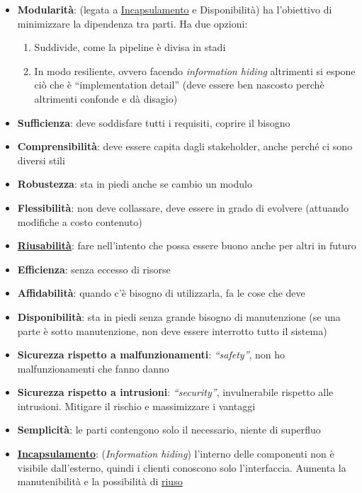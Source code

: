 		\begin{itemize}
			\item \textbf{Modularità}: (legata a \underline{\hyperref[incapsulamento]{Incapsulamento}} e Disponibilità) ha l'obiettivo di minimizzare la dipendenza tra parti. Ha due opzioni:
			\begin{enumerate}
				\item Suddivide, come la pipeline è divisa in stadi
				\item In modo resiliente, ovvero facendo \textit{information hiding} altrimenti si espone ciò che è ``implementation detail'' (deve essere ben nascosto perchè altrimenti confonde e dà disagio)
			\end{enumerate}
			\item \textbf{Sufficienza}: deve soddisfare tutti i requisiti, coprire il bisogno
			\item \textbf{Comprensibilità}: deve essere capita dagli stakeholder, anche perché ci sono diversi stili
			\item \textbf{Robustezza}: sta in piedi anche se cambio un modulo
			\item \textbf{Flessibilità}: non deve collassare, deve essere in grado di evolvere (attuando modifiche a costo contenuto)
			\item \textbf{\underline{\hyperref[riuso]{Riusabilità}}}: fare nell'intento che possa essere buono anche per altri in futuro
			\item \textbf{Efficienza}: senza eccesso di risorse
			\item \textbf{Affidabilità}: quando c'è bisogno di utilizzarla, fa le cose che deve
			\item \textbf{Disponibilità}: sta in piedi senza grande bisogno di manutenzione (se una parte è sotto manutenzione, non deve essere interrotto tutto il sistema)
			\item \textbf{Sicurezza rispetto a malfunzionamenti}: \textit{``safety''}, non ho malfunzionamenti che fanno danno
			\item \textbf{Sicurezza rispetto a intrusioni}: \textit{``security''}, invulnerabile rispetto alle intrusioni. Mitigare il rischio e massimizzare i vantaggi
			\item \textbf{Semplicità}: le parti contengono solo il necessario, niente di superfluo
			\item \textbf{\underline{\hyperref[incapsulamento]{Incapsulamento}}}: (\textit{Information hiding}) l'interno delle componenti non è visibile dall'esterno, quindi i clienti conoscono solo l'interfaccia. Aumenta la manutenibilità e la possibilità di \underline{\hyperref[riuso]{riuso}}

\end{itemize}
